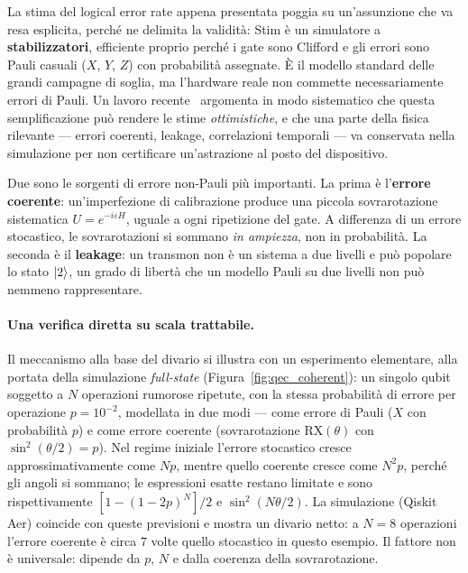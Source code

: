 \begin{onehalfspace}
La stima del logical error rate appena presentata poggia su un'assunzione che va resa esplicita, perché ne delimita la validità: Stim è un simulatore a \textbf{stabilizzatori}, efficiente proprio perché i gate sono Clifford e gli errori sono Pauli casuali ($X$, $Y$, $Z$) con probabilità assegnate. È il modello standard delle grandi campagne di soglia, ma l'hardware reale non commette necessariamente errori di Pauli. Un lavoro recente~\cite{plaquette2026} argomenta in modo sistematico che questa semplificazione può rendere le stime \emph{ottimistiche}, e che una parte della fisica rilevante --- errori coerenti, leakage, correlazioni temporali --- va conservata nella simulazione per non certificare un'astrazione al posto del dispositivo.

Due sono le sorgenti di errore non-Pauli più importanti. La prima è l'\textbf{errore coerente}: un'imperfezione di calibrazione produce una piccola sovrarotazione sistematica $U = e^{-i\varepsilon H}$, uguale a ogni ripetizione del gate. A differenza di un errore stocastico, le sovrarotazioni si sommano \emph{in ampiezza}, non in probabilità. La seconda è il \textbf{leakage}: un transmon non è un sistema a due livelli e può popolare lo stato $\ket{2}$, un grado di libertà che un modello Pauli su due livelli non può nemmeno rappresentare.

\paragraph{Una verifica diretta su scala trattabile.}
Il meccanismo alla base del divario si illustra con un esperimento elementare, alla portata della simulazione \textit{full-state} (Figura~\ref{fig:qec_coherent}): un singolo qubit soggetto a $N$ operazioni rumorose ripetute, con la stessa probabilità di errore per operazione $p = 10^{-2}$, modellata in due modi --- come errore di Pauli ($X$ con probabilità $p$) e come errore coerente (sovrarotazione $\text{RX}(\theta)$ con $\sin^2(\theta/2) = p$). Nel regime iniziale l'errore stocastico cresce approssimativamente come $Np$, mentre quello coerente cresce come $N^2p$, perché gli angoli si sommano; le espressioni esatte restano limitate e sono rispettivamente $[1-(1-2p)^N]/2$ e $\sin^2(N\theta/2)$. La simulazione (Qiskit Aer) coincide con queste previsioni e mostra un divario netto: a $N=8$ operazioni l'errore coerente è circa $7$ volte quello stocastico in questo esempio. Il fattore non è universale: dipende da $p$, $N$ e dalla coerenza della sovrarotazione.


\end{onehalfspace}
